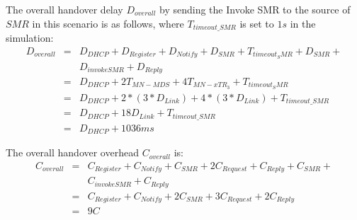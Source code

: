 The overall handover delay $D_{overall}$ by sending the Invoke SMR to the source of $SMR$ in this scenario is as follows, where $T_{timeout\_SMR}$ is set to $1 s$ in the simulation:
\begin{eqnarray}
D_{overall} &=& D_{DHCP} + D_{Register} + D_{Notify} + D_{SMR} + T_{timeout_SMR} + D_{SMR} +  \nonumber \\
& & D_{invokeSMR} + D_{Reply} \nonumber \\
&=& D_{DHCP} + 2T_{MN-MDS} + 4T_{MN-xTR_3} + T_{timeout_SMR}\nonumber \\
&=& D_{DHCP} + 2* (3*D_{Link}) + 4*(3*D_{Link}) + T_{timeout\_SMR} \nonumber \\
&=& D_{DHCP} + 18D_{Link} + T_{timeout\_SMR}  \\
&=& D_{DHCP} + 1036 ms \nonumber
\end{eqnarray}

The overall handover overhead $C_{overall}$ is:
\begin{eqnarray}
C_{overall} &=& C_{Register} + C_{Notify} + C_{SMR} + 2C_{Request} + C_{Reply} + C_{SMR} +  \nonumber \\
& & C_{invokeSMR} + C_{Reply} \nonumber \\
&=& C_{Register} + C_{Notify} + 2C_{SMR} + 3C_{Request} + 2C_{Reply}  \nonumber \\
&=& 9 C
\end{eqnarray}

